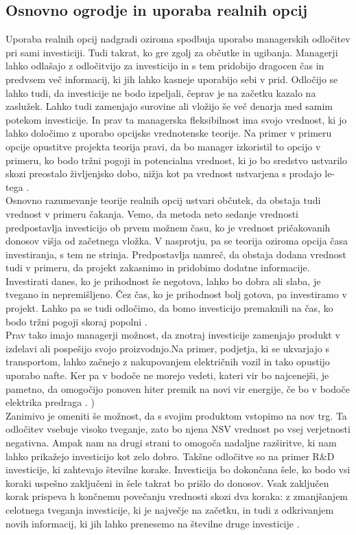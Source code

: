 \subsection{Osnovno ogrodje in uporaba realnih opcij}
Uporaba realnih opcij nadgradi oziroma spodbuja uporabo managerskih odločitev pri sami investiciji. Tudi takrat, ko gre zgolj za občutke in ugibanja. Managerji lahko odlašajo z odločitvijo za investicijo in s tem pridobijo dragocen čas in predvsem več informacij, ki jih lahko kasneje uporabijo sebi v prid. Odločijo se lahko tudi, da investicije ne bodo izpeljali, čeprav je na začetku kazalo na zaslužek. Lahko tudi zamenjajo surovine ali vložijo še več denarja med samim potekom investicije. In prav ta managerska fleksibilnost ima svojo vrednost, ki jo lahko določimo z uporabo opcijske vrednotenske teorije. Na primer v primeru opcije opustitve projekta teorija pravi, da bo manager izkoristil to opcijo v primeru, ko bodo tržni pogoji in potencialna vrednost, ki jo bo sredstvo ustvarilo skozi preostalo življenjsko dobo, nižja kot pa vrednost ustvarjena s prodajo le-tega \cite[str. 33]{Brach}.  \\

Osnovno razumevanje teorije realnih opcij ustvari občutek, da obstaja tudi vrednost v primeru čakanja. Vemo, da metoda neto sedanje vrednosti predpostavlja investicijo ob prvem možnem času, ko je vrednost pričakovanih donosov višja od začetnega vložka. V nasprotju, pa se teorija oziroma opcija časa investiranja, s tem ne strinja. Predpostavlja namreč, da obstaja dodana vrednost tudi v primeru, da projekt zakasnimo in pridobimo dodatne informacije. Investirati danes, ko je prihodnost še negotova, lahko bo dobra ali slaba, je tvegano in nepremišljeno. Čez čas, ko je prihodnost bolj gotova, pa investiramo v projekt. Lahko pa se tudi odločimo, da bomo investicijo premaknili na čas, ko bodo tržni pogoji skoraj popolni \cite[str. 34, 35]{Brach}. \\

Prav tako imajo managerji možnost, da znotraj investicije zamenjajo produkt v izdelavi ali pospešijo svojo proizvodnjo.Na primer, podjetja, ki se ukvarjajo s transportom, lahko začnejo z nakupovanjem električnih vozil in tako opustijo uporabo nafte. Ker pa v bodoče ne morejo vedeti, kateri vir bo najcenejši, je pametno, da omogočijo ponoven hiter premik na novi vir energije, če bo v bodoče elektrika predraga \cite[str. 37]{Brach}. )\\

Zanimivo je omeniti še možnost, da s svojim produktom vstopimo na nov trg. Ta odločitev vsebuje visoko tveganje, zato bo njena NSV vrednost po vsej verjetnosti negativna. Ampak nam na drugi strani to omogoča nadaljne razširitve, ki nam lahko prikažejo investicijo kot zelo dobro. Takšne odločitve so na primer R\&D investicije, ki zahtevajo številne korake. Investicija bo dokončana šele, ko bodo vsi koraki uspešno zaključeni in šele takrat bo prišlo do donosov. Vsak zaključen korak prispeva h končnemu povečanju vrednosti skozi dva koraka: z zmanjšanjem celotnega tveganja investicije, ki je največje na začetku, in tudi z odkrivanjem novih informacij, ki jih lahko prenesemo na številne druge investicije \cite[str. 38]{Brach}.\\

